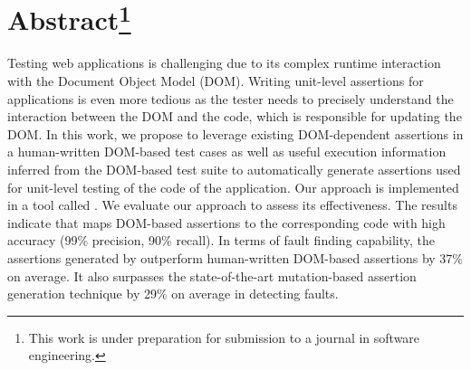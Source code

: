 \section*{Abstract\footnote{This work is under preparation for submission to a journal in software engineering.}}
Testing \javascript web applications is challenging due to its complex runtime interaction with the Document Object Model (DOM). Writing unit-level assertions for \javascript applications is even more tedious as the tester needs to precisely understand the interaction between the DOM and the \javascript code, which is responsible for updating the DOM. In this work, we propose to leverage existing DOM-dependent assertions in a human-written DOM-based test cases as well as useful execution information inferred from the DOM-based test suite to automatically generate assertions used for unit-level testing of the \javascript code of the application. Our approach is implemented in a tool called \atrina. We evaluate our approach to assess its effectiveness. The results indicate that \atrina maps DOM-based assertions to the corresponding \javascript code with high accuracy (99\% precision, 90\% recall). In terms of fault finding capability, the assertions generated by \atrina outperform human-written DOM-based assertions by 37\% on average. It also surpasses the state-of-the-art mutation-based assertion generation technique by 29\% on average in detecting faults.